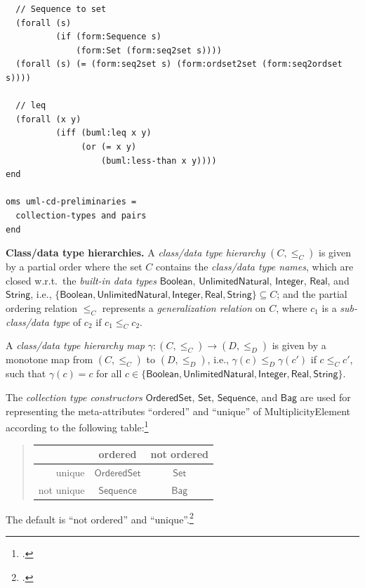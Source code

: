 \documentclass[10pt, a4paper]{isov2}
\newcommand{\uml}[1]{\textsf{#1}}
\begin{document}
\begin{lstlisting}
  // Sequence to set
  (forall (s)
          (if (form:Sequence s)
              (form:Set (form:seq2set s))))
  (forall (s) (= (form:seq2set s) (form:ordset2set (form:seq2ordset s))))

  // leq
  (forall (x y)
          (iff (buml:leq x y)
               (or (= x y)
                   (buml:less-than x y))))
end

oms uml-cd-preliminaries =
  collection-types and pairs
end
\end{lstlisting}




\textbf{Class/data type hierarchies.}  A \emph{class/data type
  hierarchy} $(C, {\leq_C})$
is given by a partial order where the set $C$
contains the \emph{class/data type names}, which are closed w.r.t.\ the
\emph{built-in data types} $\mathsf{Boolean}$,
$\mathsf{UnlimitedNatural}$,
$\mathsf{Integer}$,
$\mathsf{Real}$,
and $\mathsf{String}$,
i.e.,
$\{ \mathsf{Boolean}, \mathsf{UnlimitedNatural},\allowbreak
\mathsf{Integer}, \mathsf{Real}, \mathsf{String} \} \subseteq C$;
and the partial ordering relation $\leq_C$ represents a
\emph{generalization relation} on $C$, where $c_1$ is a
\emph{sub-class/data type} of $c_2$ if $c_1 \leq_C c_2$.

A \emph{class/data type hierarchy map}
$\gamma : (C, {\leq_C}) \to (D, {\leq_D})$ is given by a monotone map
from $(C, {\leq_C})$ to $(D, {\leq_D})$, i.e.,
$\gamma(c) \leq_D \gamma(c')$ if $c \leq_C c'$, such that
$\gamma(c) = c$ for all
$c \in \{ \mathsf{Boolean},\allowbreak \mathsf{UnlimitedNatural},\allowbreak
\mathsf{Integer}, \mathsf{Real}, \mathsf{String} \}$.

The \emph{collection type constructors} $\mathsf{OrderedSet}$,
$\mathsf{Set}$, $\mathsf{Sequence}$, and $\mathsf{Bag}$ are used for
representing the meta-attributes ``ordered'' and ``unique'' of
\uml{MultiplicityElement} according to the following
table:\footnote{\cite[p.~34]{uml-2.5}.}
%
\begin{quotation}
\begin{tabular}{@{}r||c|c@{}}
             & ordered               & not ordered\\
\hline\hline
  unique     & $\mathsf{OrderedSet}$ & $\mathsf{Set}$\\
\hline
  not unique & $\mathsf{Sequence}$   & $\mathsf{Bag}$
\end{tabular}
\end{quotation}
%
The default is ``not ordered'' and
``unique''.\footnote{\cite[p.~33]{uml-2.5}.}
\end{document}
